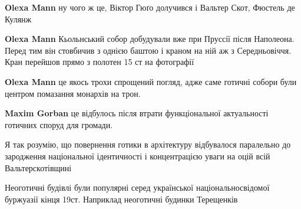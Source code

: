 \begin{itemize}
\begin{itemize}
\textbf{Olexa Mann} ну чого ж це, Віктор Гюґо долучився і Вальтер Скот, Фюстель де Кулянж

 
\textbf{Olexa Mann} Кьольнський собор добудували вже при Пруссії після Наполеона. Перед тим він стовбичив з однією баштою і краном на ній аж з Середньовіччя. Кран перейшов прямо з полотен 15 ст на фотографії

 
\textbf{Olexa Mann} це якось трохи спрощений погляд, адже саме готичні собори були центром помазання монархів на трон.

 

\textbf{Maxim Gorban} це відбулось після втрати функціональної актуальності готичних споруд для громади.

 
Я так розумію, що повернення готики в архітектуру відбувалося паралельно до зародження національної ідентичності і концентрацією уваги на оцій всій Вальтерскотівщині

 
Неоготичні будівлі були популярні серед української національносвідомої буржуазії кінця 19ст. Наприклад неоготичні будинки Терещенків
\end{itemize} %


\end{itemize}
